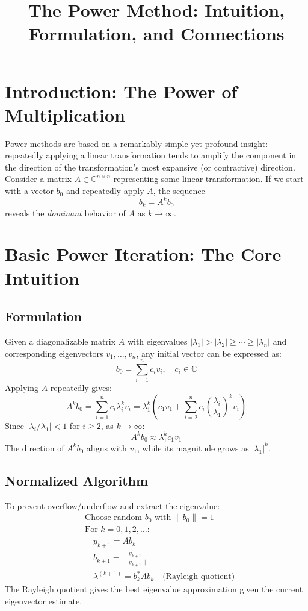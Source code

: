 \documentclass[11pt]{article}
\title{The Power Method: Intuition, Formulation, and Connections}
\author{}
\date{}
\begin{document}
\maketitle

\section*{Introduction: The Power of Multiplication}

Power methods are based on a remarkably simple yet profound insight: repeatedly applying a linear transformation tends to amplify the component in the direction of the transformation's most expansive (or contractive) direction. Consider a matrix $A \in \mathbb{C}^{n \times n}$ representing some linear transformation. If we start with a vector $b_0$ and repeatedly apply $A$, the sequence
\[
b_k = A^k b_0
\]
reveals the \emph{dominant} behavior of $A$ as $k \to \infty$.

\section{Basic Power Iteration: The Core Intuition}

\subsection{Formulation}
Given a diagonalizable matrix $A$ with eigenvalues $|\lambda_1| > |\lambda_2| \geq \cdots \geq |\lambda_n|$ and corresponding eigenvectors $v_1, \dots, v_n$, any initial vector can be expressed as:
\[
b_0 = \sum_{i=1}^n c_i v_i, \quad c_i \in \mathbb{C}
\]
Applying $A$ repeatedly gives:
\[
A^k b_0 = \sum_{i=1}^n c_i \lambda_i^k v_i 
      = \lambda_1^k \left( c_1 v_1 + \sum_{i=2}^n c_i \left(\frac{\lambda_i}{\lambda_1}\right)^k v_i \right)
\]
Since $|\lambda_i/\lambda_1| < 1$ for $i \geq 2$, as $k \to \infty$:
\[
A^k b_0 \approx \lambda_1^k c_1 v_1
\]
The direction of $A^k b_0$ aligns with $v_1$, while its magnitude grows as $|\lambda_1|^k$.

\subsection{Normalized Algorithm}
To prevent overflow/underflow and extract the eigenvalue:
\begin{align*}
& \text{Choose random } b_0 \text{ with } \|b_0\| = 1 \\
& \text{For } k = 0, 1, 2, \dots: \\
& \quad y_{k+1} = A b_k \\
& \quad b_{k+1} = \frac{y_{k+1}}{\|y_{k+1}\|} \\
& \quad \lambda^{(k+1)} = b_k^* A b_k \quad \text{(Rayleigh quotient)}
\end{align*}
The Rayleigh quotient gives the best eigenvalue approximation given the current eigenvector estimate.
\end{document}
